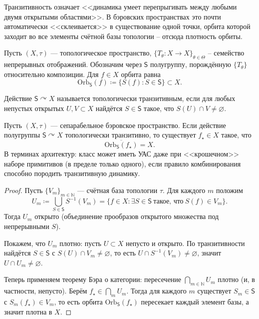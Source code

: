 \documentclass[../NDCNNAI_main.tex]{subfiles}
\begin{document}
\begin{remark}
Транзитивность означает <<динамика умеет перепрыгивать между любыми двумя открытыми областями>>.
В бэровских пространствах это почти автоматически <<склеивается>> в существование одной точки,
орбита которой заходит во все элементы счётной базы топологии -- отсюда плотность орбиты.
\end{remark}

\begin{definition}
Пусть $(X,\tau)$ --- топологическое пространство, $\{T_\theta:X\to X\}_{\theta\in\Theta}$ --
семейство непрерывных отображений. Обозначим через $\mathsf{S}$ полугруппу,
порождённую $\{T_\theta\}$ относительно композиции.
Для $f\in X$ орбита равна
\[
\mathrm{Orb}_{\mathsf{S}}(f)\coloneq \{S(f):S\in\mathsf{S}\}\subset X.
\]
\end{definition}

\begin{definition}
Действие $\mathsf{S}\curvearrowright X$ называется топологически транзитивным, если
для любых непустых открытых $U,V\subset X$ найдётся $S\in\mathsf{S}$ такое, что
$S(U)\cap V\neq\varnothing$.
\end{definition}

\begin{theorem}
Пусть $(X,\tau)$ --- сепарабельное бэровское пространство.
Если действие полугруппы $\mathsf{S}\curvearrowright X$ топологически транзитивно, то существует
$f_\star\in X$ такое, что
\[
\overline{\mathrm{Orb}_{\mathsf{S}}(f_\star)}=X.
\]
В терминах архитектур: класс может иметь УАС даже при <<крошечном>> наборе примитивов
(в пределе только одного), если правило комбинирования способно породить транзитивную динамику.
\end{theorem}

\begin{proof}
Пусть $\{V_m\}_{m\in\mathbb{N}}$ --- счётная база топологии $\tau$.
Для каждого $m$ положим
\[
    U_m\coloneq \bigcup_{S\in\mathsf{S}} S^{-1}(V_m)=\{f\in X:\exists S\in\mathsf{S}\ \text{такое, что}\ S(f)\in V_m\}.
\]
Тогда $U_m$ открыто (объединение прообразов открытого множества под непрерывными $S$).

Покажем, что $U_m$ плотно: пусть $U\subset X$ непусто и открыто. По транзитивности
найдётся $S\in\mathsf{S}$ с $S(U)\cap V_m\neq\varnothing$, то есть
$U\cap S^{-1}(V_m)\neq\varnothing$, значит $U\cap U_m\neq\varnothing$.

Теперь применяем теорему Бэра о категории: пересечение $\bigcap_{m\in\mathbb{N}}U_m$ плотно (и, в частности, непусто).
Берём $f_\star\in\bigcap_m U_m$. Тогда для каждого $m$ существует $S_m\in\mathsf{S}$ с $S_m(f_\star)\in V_m$,
то есть орбита $\mathrm{Orb}_{\mathsf{S}}(f_\star)$ пересекает каждый элемент базы, а значит плотна в $X$.
\end{proof}
\end{document}
